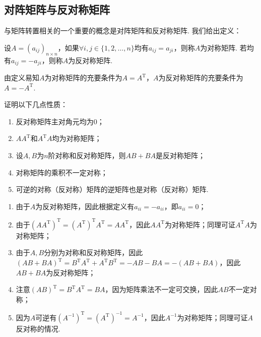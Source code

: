\subsection{对阵矩阵与反对称矩阵}

与矩阵转置相关的一个重要的概念是对阵矩阵和反对称矩阵. 我们给出定义：
\begin{definition}{}{}
    设$A=(a_{ij})_{n \times n}$，如果$\forall i,j\in\{1,2,\ldots,n\}$均有$a_{ij}=a_{ji}$，则称$A$为对称矩阵. 若均有$a_{ij}=-a_{ji}$，则称$A$为反对称矩阵.
\end{definition}
由定义易知$A$为对称矩阵的充要条件为$A=A^\mathrm{T}$，$A$为反对称矩阵的充要条件为$A=-A^\mathrm{T}$.
\begin{example}{}{}
    证明以下几点性质：
    \begin{enumerate}
        \item 反对称矩阵主对角元均为0；

        \item $AA^\mathrm{T}$和$A^\mathrm{T}A$均为对称矩阵；

        \item 设$A,B$为$n$阶对称和反对称矩阵，则$AB+BA$是反对称矩阵；

        \item 对称矩阵的乘积不一定对称；

        \item 可逆的对称（反对称）矩阵的逆矩阵也是对称（反对称）矩阵.
    \end{enumerate}
\end{example}

\begin{solution}
    \begin{enumerate}
        \item 由于$A$为反对称矩阵，因此根据定义有$a_{ii}=-a_{ii}$，即$a_{ii}=0$；

        \item 由于$(AA^\mathrm{T})^\mathrm{T}=(A^\mathrm{T})^\mathrm{T}A^\mathrm{T}=AA^\mathrm{T}$，因此$AA^\mathrm{T}$为对称矩阵；同理可证$A^\mathrm{T}A$为对称矩阵；

        \item 由于$A,B$分别为对称和反对称矩阵，因此$(AB+BA)^\mathrm{T}=B^\mathrm{T}A^\mathrm{T}+A^\mathrm{T}B^\mathrm{T}=-AB-BA=-(AB+BA)$，因此$AB+BA$为反对称矩阵；

        \item 注意$(AB)^\mathrm{T}=B^\mathrm{T}A^\mathrm{T}=BA$，因为矩阵乘法不一定可交换，因此$AB$不一定对称；

        \item 因为$A$可逆有$(A^{-1})^\mathrm{T}=(A^\mathrm{T})^{-1}=A^{-1}$，因此$A^{-1}$为对称矩阵；同理可证$A$反对称的情况.
    \end{enumerate}
\end{solution}

